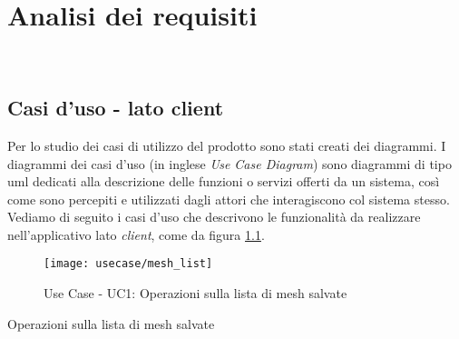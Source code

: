 
\chapter{Analisi dei requisiti}
\label{cap:analisi-requisiti}

\intro{}\\

\section{Casi d'uso - lato client}

Per lo studio dei casi di utilizzo del prodotto sono stati creati dei diagrammi.
I diagrammi dei casi d'uso (in inglese \emph{Use Case Diagram}) sono diagrammi di tipo \gls{uml} dedicati alla descrizione delle funzioni o servizi offerti da un sistema, così come sono percepiti e utilizzati dagli attori che interagiscono col sistema stesso.
Vediamo di seguito i casi d'uso che descrivono le funzionalità da realizzare nell'applicativo lato \emph{client}, come da figura \ref{fig:mesh-list}.
\begin{figure}[!h] 
    \centering 
    \texttt{[image: usecase/mesh\_list]} 
    \caption{Use Case - UC1: Operazioni sulla lista di mesh salvate}
    \label{fig:mesh-list}
\end{figure}

\begin{usecase}{1}{Operazioni sulla lista di mesh salvate}
\\ 
\\ 
\\ 
\label{uc:lista-mesh}
\end{usecase}

